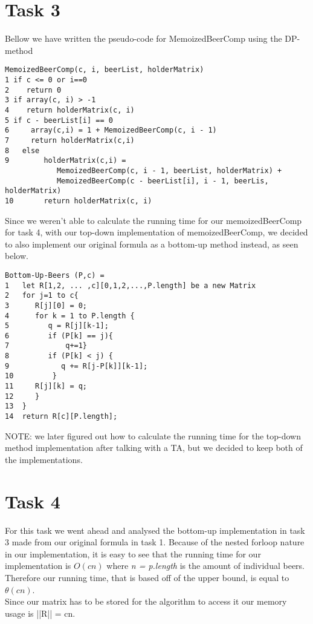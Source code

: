\documentclass[12pt]{article}
\begin{document}
\section{Task 3}
Bellow we have written the pseudo-code for MemoizedBeerComp using the DP-method\\
\begin{verbatim}
MemoizedBeerComp(c, i, beerList, holderMatrix)
1 if c <= 0 or i==0
2    return 0
3 if array(c, i) > -1
4    return holderMatrix(c, i)
5 if c - beerList[i] == 0
6     array(c,i) = 1 + MemoizedBeerComp(c, i - 1)
7     return holderMatrix(c,i)
8   else
9        holderMatrix(c,i) =
            MemoizedBeerComp(c, i - 1, beerList, holderMatrix) +
            MemoizedBeerComp(c - beerList[i], i - 1, beerLis, holderMatrix)
10       return holderMatrix(c, i)
\end{verbatim}
Since we weren't able to calculate the running time for our memoizedBeerComp for task 4, with our top-down implementation of memoizedBeerComp, we decided to also implement our original formula as a bottom-up method instead, as seen below.
\begin{verbatim}
Bottom-Up-Beers (P,c) = 
1   let R[1,2, ... ,c][0,1,2,...,P.length] be a new Matrix
2   for j=1 to c{
3      R[j][0] = 0;
4      for k = 1 to P.length {
5         q = R[j][k-1];
6         if (P[k] == j){ 
7             q+=1}   
8         if (P[k] < j) {
9            q += R[j-P[k]][k-1];
10         }
11     R[j][k] = q;	
12     }
13  }
14	return R[c][P.length];
\end{verbatim}
NOTE: we later figured out how to calculate the running time for the top-down method implementation after talking with a TA, but we decided to keep both of the implementations.
\section{Task 4}
For this task we went ahead and analysed the bottom-up implementation in task 3 made from our original formula in task 1. Because of the nested forloop nature in our implementation, it is easy to see that the running time for our implementation is $O(cn)$ where \textit{n = p.length} is the amount of individual beers. Therefore our running time, that is based off of the upper bound, is equal to $\theta(cn)$.\\

Since our matrix has to be stored for the algorithm to access it our memory usage is ||R|| = cn.\\
\end{document}
